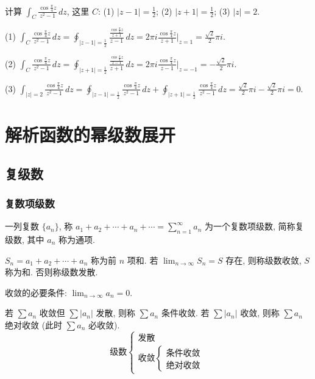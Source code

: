 \documentclass[theorem=false,mathfont=none,openany,sub3section]{easybook}
\begin{document}
\begin{example}
  计算 $\int_{C}\frac{\cos\frac{\pi}{4}z}{z^{2}-1}\,dz$, 这里 $C$:
  (1) $|z-1|=\frac{1}{2}$; (2) $|z+1|=\frac{1}{2}$; (3) $|z|=2$.

  (1) $\displaystyle\int_{C}\frac{\cos\frac{\pi}{4}z}{z^{2}-1}\,dz
  =\oint_{|z-1|=\frac{1}{2}}\frac{\frac{\cos\frac{\pi}{4}z}{z+1}}{z-1}\,dz
  =2\pi i\frac{\cos\frac{\pi}{4}z}{z+1}\Big|_{z=1}=\frac{\sqrt{2}}{2}\pi i$.

  (2) $\displaystyle\int_{C}\frac{\cos\frac{\pi}{4}z}{z^{2}-1}\,dz
  =\oint_{|z+1|=\frac{1}{2}}\frac{\frac{\cos\frac{\pi}{4}z}{z-1}}{z+1}\,dz
  =2\pi i\frac{\cos\frac{\pi}{4}z}{z-1}\Big|_{z=-1}=-\frac{\sqrt{2}}{2}\pi i$.

  (3) $\displaystyle\int_{|z|=2}\frac{\cos\frac{\pi}{4}z}{z^{2}-1}\,dz
  =\oint_{|z-1|=\frac{1}{2}}\frac{\cos\frac{\pi}{4}z}{z^{2}-1}\,dz
  +\oint_{|z+1|=\frac{1}{2}}\frac{\cos\frac{\pi}{4}z}{z^{2}-1}\,dz
  =\frac{\sqrt{2}}{2}\pi i-\frac{\sqrt{2}}{2}\pi i=0$.
\end{example}

\newpage

\chapter{解析函数的幂级数展开}

\section{复级数}

\subsection{复数项级数}

\begin{definition}
  一列复数 $\{a_{n}\}$, 称 $a_{1}+a_{2}+\cdots+a_{n}+\cdots=\sum_{n=1}^{\infty}a_{n}$ 为一个复数项级数, 简称复级数, 其中 $a_{n}$ 称为通项.\par
  $S_{n}=a_{1}+a_{2}+\cdots+a_{n}$ 称为前 $n$ 项和. 若 $\lim_{n\to\infty}S_{n}=S$ 存在, 则称级数收敛, $S$ 称为和. 否则称级数发散.
\end{definition}

收敛的必要条件: $\lim_{n\to\infty}a_{n}=0$.

若 $\sum a_{n}$ 收敛但 $\sum|a_{n}|$ 发散, 则称 $\sum a_{n}$ 条件收敛. 若 $\sum|a_{n}|$ 收敛, 则称 $\sum a_{n}$ 绝对收敛 (此时 $\sum a_{n}$ 必收敛).
\[
\text{级数}\begin{cases}
  \text{发散}\\
  \text{收敛}\begin{cases}
    \text{条件收敛}\\
    \text{绝对收敛}
  \end{cases}
\end{cases}
\]
\end{document}
